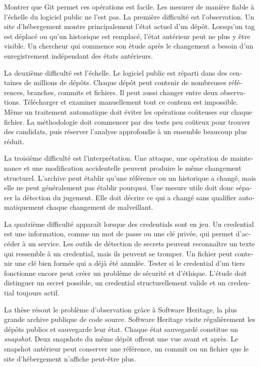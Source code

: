 \begin{otherlanguage}{french}
\begin{SingleSpace}
Montrer que Git permet ces opérations est facile.
Les mesurer de manière fiable à l'échelle du logiciel public ne l'est pas.
La première difficulté est l'observation.
Un site d'hébergement montre principalement l'état actuel d'un dépôt.
Lorsqu'un tag est déplacé ou qu'un historique est remplacé, l'état antérieur peut ne plus y être visible.
Un chercheur qui commence son étude après le changement a besoin d'un enregistrement indépendant des états antérieurs.

La deuxième difficulté est l'échelle.
Le logiciel public est réparti dans des centaines de millions de dépôts.
Chaque dépôt peut contenir de nombreuses références, branches, commits et fichiers.
Il peut aussi changer entre deux observations.
Télécharger et examiner manuellement tout ce contenu est impossible.
Même un traitement automatique doit éviter les opérations coûteuses sur chaque fichier.
La méthodologie doit commencer par des tests peu coûteux pour trouver des candidats, puis réserver l'analyse approfondie à un ensemble beaucoup plus réduit.

La troisième difficulté est l'interprétation.
Une attaque, une opération de maintenance et une modification accidentelle peuvent produire le même changement structurel.
L'archive peut établir qu'une référence ou un historique a changé, mais elle ne peut généralement pas établir pourquoi.
Une mesure utile doit donc séparer la détection du jugement.
Elle doit décrire ce qui a changé sans qualifier automatiquement chaque changement de malveillant.

La quatrième difficulté apparaît lorsque des credentials sont en jeu.
Un credential est une information, comme un mot de passe ou une clé privée, qui permet d'accéder à un service.
Les outils de détection de secrets peuvent reconnaître un texte qui ressemble à un credential, mais ils peuvent se tromper.
Un fichier peut contenir une clé bien formée qui a déjà été annulée.
Tester si le credential d'un tiers fonctionne encore peut créer un problème de sécurité et d'éthique.
L'étude doit distinguer un secret possible, un credential structurellement valide et un credential toujours actif.

La thèse résout le problème d'observation grâce à Software Heritage, la plus grande archive publique de code source.
Software Heritage visite régulièrement les dépôts publics et sauvegarde leur état.
Chaque état sauvegardé constitue un \emph{snapshot}.
Deux snapshots du même dépôt offrent une vue avant et après.
Le snapshot antérieur peut conserver une référence, un commit ou un fichier que le site d'hébergement n'affiche peut-être plus.


\end{SingleSpace}
\end{otherlanguage}
